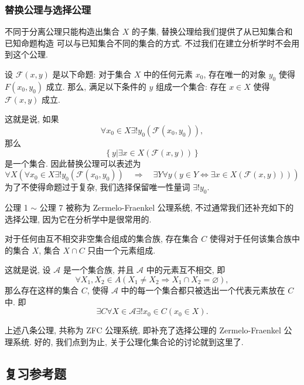 \documentclass[10pt,UTF8]{book} %
\begin{document}
\subsubsection{替换公理与选择公理}

不同于分离公理只能构造出集合 $X$ 的子集, 替换公理给我们提供了从已知集合和已知命题构造
可以与已知集合不同的集合的方式. 不过我们在建立分析学时不会用到这个公理.

\begin{axiom}[替换公理]
    设 $\mathcal{F}(x,y)$ 是以下命题: 对于集合 $X$ 中的任何元素 $x_0$, 存在唯一的对象
    $y_0$ 使得 $F(x_0, y_0)$ 成立. 那么, 满足以下条件的 $y$ 组成一个集合:
    存在 $x \in X$ 使得 $\mathcal{F}(x,y)$ 成立.
\end{axiom}

这就是说, 如果
\[ \forall x_0 \in X \exists ! y_0  (\mathcal{F}(x_0, y_0)) ,\]
那么
\[ \left\{ y | \exists x \in X  (\mathcal{F}(x,y))  \right\} \]
是一个集合. 因此替换公理可以表述为
\[ \forall X \left( 
    \forall x_0 \in X\exists ! y_0 (\mathcal{F}(x_0, y_0))
    \quad \Longrightarrow \quad 
    \exists Y \forall y \left(  y \in Y \Leftrightarrow
    \exists x \in X (\mathcal{F}(x,y)) \right)
\right) \]
为了不使得命题过于复杂, 我们选择保留唯一性量词 $\exists ! y_0$.

公理 1 $\sim$ 公理 7 被称为 Zermelo-Fraenkel 公理系统,
不过通常我们还补充如下的选择公理, 因为它在分析学中是很常用的.

\begin{axiom}[选择公理]
    对于任何由互不相交非空集合组成的集合族, 存在集合 $C$ 使得对于任何该集合族中的集合 $X$,
    集合 $X \cap C$ 只由一个元素组成.
\end{axiom}

这就是说, 设 $\mathscr{A}$ 是一个集合族, 并且 $\mathscr{A}$ 中的元素互不相交, 即 
\[ \forall X_1, X_2 \in A \left(
    X_1 \ne X_2 \Rightarrow X_1 \cap X_2 = \varnothing
\right), \]
那么存在这样的集合 $C$, 使得 $\mathscr{A}$ 中的每一个集合都只被选出一个代表元素放在
$C$ 中. 即
\[ \exists C \forall X \in \mathscr{A} \exists! x_0 \in C \left(
    x_0 \in X
\right). \]

上述八条公理, 共称为 ZFC 公理系统, 即补充了选择公理的 Zermelo-Fraenkel 公理系统.
好的, 我们点到为止, 关于公理化集合论的讨论就到这里了.

\subsection{复习参考题}
\end{document}
